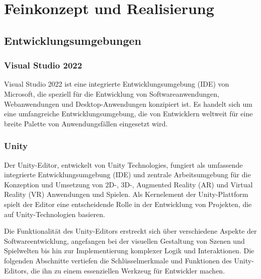 \setcounter{secnumdepth}{4}

\chapter{Feinkonzept und Realisierung}

\section{Entwicklungsumgebungen}
\subsection{Visual Studio 2022}
Visual Studio 2022 ist eine integrierte Entwicklungsumgebung (IDE) von Microsoft, die speziell für die Entwicklung von
Softwareanwendungen, Webanwendungen und Desktop-Anwendungen konzipiert ist. Es handelt sich um eine umfangreiche
Entwicklungsumgebung, die von Entwicklern weltweit für eine breite Palette von Anwendungsfällen eingesetzt wird.

\subsection{Unity}
Der Unity-Editor, entwickelt von Unity Technologies, fungiert als umfassende integrierte Entwicklungsumgebung (IDE)
und zentrale Arbeitsumgebung für die Konzeption und Umsetzung von 2D-, 3D-, Augmented Reality (AR) und Virtual Reality
(VR) Anwendungen und Spielen. Als Kernelement der Unity-Plattform spielt der Editor eine entscheidende Rolle in der
Entwicklung von Projekten, die auf Unity-Technologien basieren.

Die Funktionalität des Unity-Editors erstreckt sich über verschiedene Aspekte der Softwareentwicklung, angefangen bei
der visuellen Gestaltung von Szenen und Spielwelten bis hin zur Implementierung komplexer Logik und Interaktionen. Die
folgenden Abschnitte vertiefen die Schlüsselmerkmale und Funktionen des Unity-Editors, die ihn zu einem essenziellen
Werkzeug für Entwickler machen.

